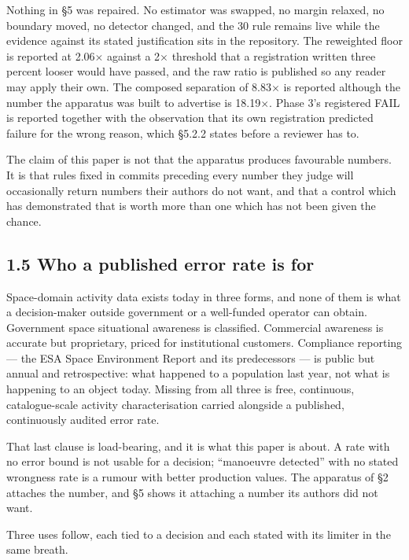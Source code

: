 \documentclass[11pt]{article}
\begin{document}
Nothing in \S{}5 was repaired. No estimator was swapped, no margin relaxed, no boundary moved, no detector changed, and the 30\textdegree{} rule remains live while the evidence against its stated justification sits in the repository. The reweighted floor is reported at 2.06$\times$ against a 2$\times$ threshold that a registration written three percent looser would have passed, and the raw ratio is published so any reader may apply their own. The composed separation of 8.83$\times$ is reported although the number the apparatus was built to advertise is 18.19$\times$. Phase 3's registered FAIL is reported together with the observation that its own registration predicted failure for the wrong reason, which \S{}5.2.2 states before a reviewer has to.

The claim of this paper is not that the apparatus produces favourable numbers. It is that rules fixed in commits preceding every number they judge will occasionally return numbers their authors do not want, and that a control which has demonstrated that is worth more than one which has not been given the chance.

\subsection*{1.5 Who a published error rate is for}

Space-domain activity data exists today in three forms, and none of them is what a decision-maker outside government or a well-funded operator can obtain. Government space situational awareness is classified. Commercial awareness is accurate but proprietary, priced for institutional customers. Compliance reporting --- the ESA Space Environment Report and its predecessors --- is public but annual and retrospective: what happened to a population last year, not what is happening to an object today. Missing from all three is free, continuous, catalogue-scale activity characterisation carried alongside a published, continuously audited error rate.

That last clause is load-bearing, and it is what this paper is about. A rate with no error bound is not usable for a decision; ``manoeuvre detected'' with no stated wrongness rate is a rumour with better production values. The apparatus of \S{}2 attaches the number, and \S{}5 shows it attaching a number its authors did not want.

Three uses follow, each tied to a decision and each stated with its limiter in the same breath.
\end{document}
